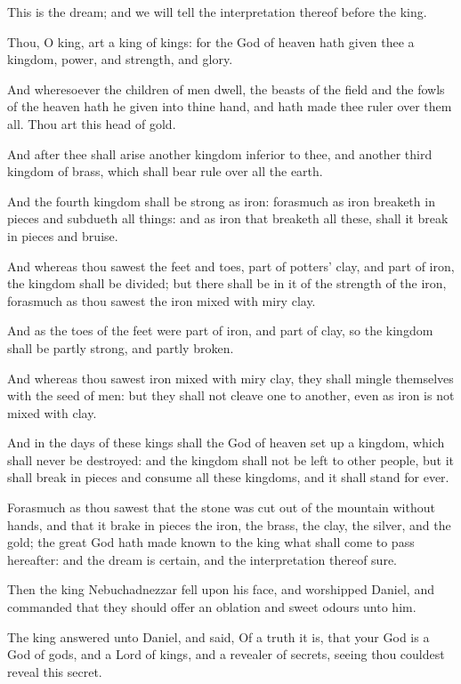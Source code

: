 \Verse This is the dream; and we will tell the interpretation thereof before the king.

\Verse Thou, O king, art a king of kings: for the God of heaven hath given thee a kingdom, power, and strength, and glory.

\Verse And wheresoever the children of men dwell, the beasts of the field and the fowls of the heaven hath he given into thine hand, and hath made thee ruler over them all. Thou art this head of gold.

\Verse And after thee shall arise another kingdom inferior to thee, and another third kingdom of brass, which shall bear rule over all the earth.

\Verse And the fourth kingdom shall be strong as iron: forasmuch as iron breaketh in pieces and subdueth all things: and as iron that breaketh all these, shall it break in pieces and bruise.

\Verse And whereas thou sawest the feet and toes, part of potters' clay, and part of iron, the kingdom shall be divided; but there shall be in it of the strength of the iron, forasmuch as thou sawest the iron mixed with miry clay.

\Verse And as the toes of the feet were part of iron, and part of clay, so the kingdom shall be partly strong, and partly broken.

\Verse And whereas thou sawest iron mixed with miry clay, they shall mingle themselves with the seed of men: but they shall not cleave one to another, even as iron is not mixed with clay.

\Verse And in the days of these kings shall the God of heaven set up a kingdom, which shall never be destroyed: and the kingdom shall not be left to other people, but it shall break in pieces and consume all these kingdoms, and it shall stand for ever.

\Verse Forasmuch as thou sawest that the stone was cut out of the mountain without hands, and that it brake in pieces the iron, the brass, the clay, the silver, and the gold; the great God hath made known to the king what shall come to pass hereafter: and the dream is certain, and the interpretation thereof sure.

\Verse Then the king Nebuchadnezzar fell upon his face, and worshipped Daniel, and commanded that they should offer an oblation and sweet odours unto him.

\Verse The king answered unto Daniel, and said, Of a truth it is, that your God is a God of gods, and a Lord of kings, and a revealer of secrets, seeing thou couldest reveal this secret.

